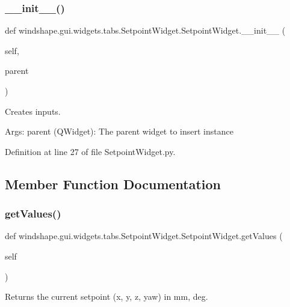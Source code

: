 \subsubsection{\texorpdfstring{\+\_\+\+\_\+init\+\_\+\+\_\+()}{\_\_init\_\_()}}
{\footnotesize\ttfamily def windshape.\+gui.\+widgets.\+tabs.\+Setpoint\+Widget.\+Setpoint\+Widget.\+\_\+\+\_\+init\+\_\+\+\_\+ (\begin{DoxyParamCaption}\item[{}]{self,  }\item[{}]{parent }\end{DoxyParamCaption})}

\begin{DoxyVerb}Creates inputs.

Args:
    parent (QWidget): The parent widget to insert instance
\end{DoxyVerb}
 

Definition at line 27 of file Setpoint\+Widget.\+py.



\subsection{Member Function Documentation}
\mbox{\label{classwindshape_1_1gui_1_1widgets_1_1tabs_1_1_setpoint_widget_1_1_setpoint_widget_a93bfd2c10c320071ea37ff41e977378f}} 
\subsubsection{\texorpdfstring{get\+Values()}{getValues()}}
{\footnotesize\ttfamily def windshape.\+gui.\+widgets.\+tabs.\+Setpoint\+Widget.\+Setpoint\+Widget.\+get\+Values (\begin{DoxyParamCaption}\item[{}]{self }\end{DoxyParamCaption})}

\begin{DoxyVerb}Returns the current setpoint (x, y, z, yaw) in mm, deg.\end{DoxyVerb}
 


